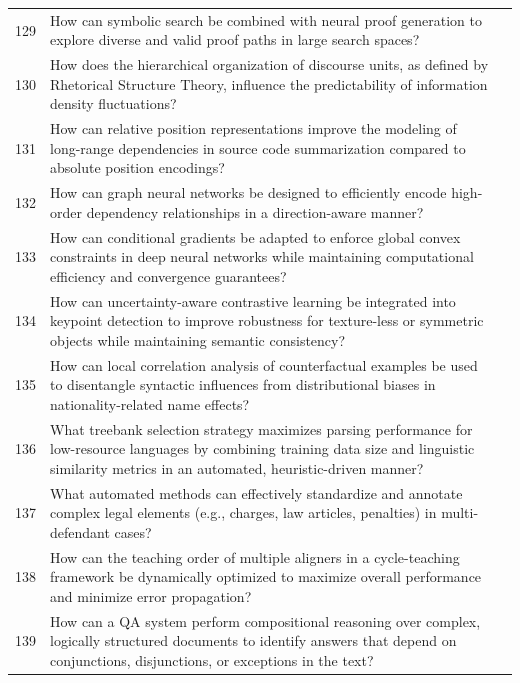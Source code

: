 \begin{longtable}{@{}p{0.5cm}p{7.2cm}p{2.5cm}@{}}
129 & How can symbolic search be combined with neural proof generation to explore diverse and valid proof paths in large search spaces? & \cite{10.18653/v1/2022.emnlp-main.7} \\
130 & How does the hierarchical organization of discourse units, as defined by Rhetorical Structure Theory, influence the predictability of information density fluctuations? & \cite{10.18653/v1/2024.emnlp-main.1047} \\
131 & How can relative position representations improve the modeling of long-range dependencies in source code summarization compared to absolute position encodings? & \cite{10.18653/v1/2020.acl-main.449} \\
132 & How can graph neural networks be designed to efficiently encode high-order dependency relationships in a direction-aware manner? & \cite{10.18653/v1/n19-1237} \\
133 & How can conditional gradients be adapted to enforce global convex constraints in deep neural networks while maintaining computational efficiency and convergence guarantees? & \cite{10.1609/aaai.v33i01.33014772} \\
134 & How can uncertainty-aware contrastive learning be integrated into keypoint detection to improve robustness for texture-less or symmetric objects while maintaining semantic consistency? & \cite{10.1609/aaai.v36i5.20482} \\
135 & How can local correlation analysis of counterfactual examples be used to disentangle syntactic influences from distributional biases in nationality-related name effects? & \cite{10.18653/v1/2024.emnlp-main.34} \\
136 & What treebank selection strategy maximizes parsing performance for low-resource languages by combining training data size and linguistic similarity metrics in an automated, heuristic-driven manner? & \cite{10.18653/v1/2021.findings-acl.431} \\
137 & What automated methods can effectively standardize and annotate complex legal elements (e.g., charges, law articles, penalties) in multi-defendant cases? & \cite{10.18653/v1/2024.findings-acl.351} \\
138 & How can the teaching order of multiple aligners in a cycle-teaching framework be dynamically optimized to maximize overall performance and minimize error propagation? & \cite{10.1609/aaai.v36i4.20348} \\
139 & How can a QA system perform compositional reasoning over complex, logically structured documents to identify answers that depend on conjunctions, disjunctions, or exceptions in the text? & \cite{10.18653/v1/2022.acl-long.253} \\

\end{longtable}
